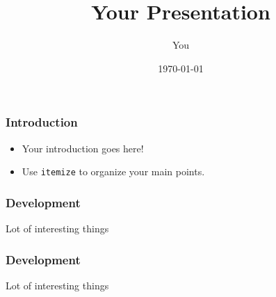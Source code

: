 \documentclass[notes]{beamer}       %
\title[Your Short Title]{Your Presentation}
\author{You}
\institute{Where You're From}
\date{\today}
\begin{document}
\begin{frame}
  \titlepage
\end{frame}

\begin{frame}
    \frametitle{Introduction}

\begin{itemize}
  \item Your introduction goes here!
  \item Use \texttt{itemize} to organize your main points.
\end{itemize}

\end{frame}


\begin{frame}
    \frametitle{Development}

    Lot of interesting things

\end{frame}


\begin{frame}
    \frametitle{Development}

    Lot of interesting things

\end{frame}
\end{document}
